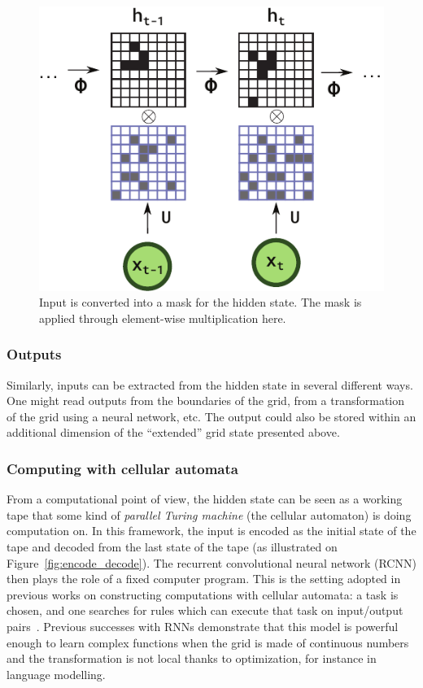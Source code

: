 \begin{description}
\begin{figure}[ht]
  \centering
  \includegraphics[width=.5\linewidth]{figures/mask.pdf}
  \caption{\label{fig:mask} Input is converted into a mask for the hidden state.
  The mask is applied through element-wise multiplication here.}
\end{figure}

\end{description}

\subsubsection{Outputs}
Similarly, inputs can be extracted from the hidden state in several different
ways. One might read outputs from the boundaries of the grid, from a
transformation of the grid using a neural network, etc. The output could also be
stored within an additional dimension of the ``extended'' grid state presented
above.

\subsubsection{Computing with cellular automata}

From a computational point of view, the hidden state can be seen as a working
tape that some kind of \emph{parallel Turing machine} (the cellular automaton)
is doing computation on. In this framework, the input is encoded as the initial
state of the tape and decoded from the last state of the tape (as illustrated on
Figure~\ref{fig:encode_decode}). The recurrent convolutional neural network
(RCNN) then plays the role of a fixed computer program. This is the setting
adopted in previous works on constructing computations with cellular automata: a
task is chosen, and one searches for rules which can execute that task on
input/output pairs~\parencite{mitchellComputationCellularAutomata2005}. Previous
successes with RNNs demonstrate that this model is powerful enough to learn
complex functions when the grid is made of continuous numbers and the
transformation is not local thanks to optimization, for instance in language
modelling.


